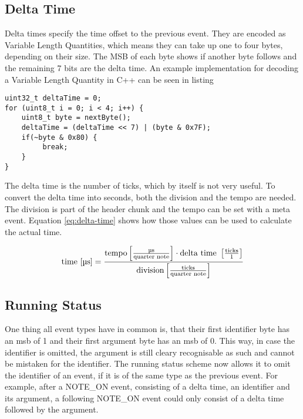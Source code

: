 \subsection{Delta Time}

Delta times specify the time offset to the previous event. They are encoded as Variable Length Quantities, which means they can take up one to four bytes, depending on their size. The MSB %
of each byte shows if another byte follows and the remaining 7 bits are the delta time. An example implementation for decoding a Variable Length Quantity in C++ can be seen in listing

\begin{lstlisting}
uint32_t deltaTime = 0;
for (uint8_t i = 0; i < 4; i++) {
    uint8_t byte = nextByte();
    deltaTime = (deltaTime << 7) | (byte & 0x7F);
    if(~byte & 0x80) {
         break;
    }
}
\end{lstlisting}

The delta time is the number of ticks, which by itself is not very useful. To convert the delta time into seconds, both the division and the tempo are needed. The division is part of the header chunk and the tempo can be set with a meta event. Equation \ref{eq:delta-time} shows how those values can be used to calculate the actual time.

\begin{equation}\label{eq:delta-time}
    \textnormal{time [\textmu s]} = \frac{{\textnormal{tempo} \left[ \frac{\textnormal{\textmu s}}{\textnormal{quarter note}} \right] \cdot \textnormal{delta time } \left[\frac{\textnormal{ticks}}{1}\right]}}{\textnormal{division}  \left[ \frac{\textnormal{ticks}}{\textnormal{quarter note}} \right]}
\end{equation}

\subsection{Running Status}

One thing all event types have in common is, that their first identifier byte has an \gls{msb} of 1 and their first argument byte has an \gls{msb} of 0. This way, in case the identifier is omitted, the argument is still cleary recognisable as such and cannot be mistaken for the identifier. The running status scheme now allows it to omit the identifier of an event, if it is of the same type as the previous event. For example, after a NOTE\_ON event, consisting of a delta time, an identifier and its argument, a following NOTE\_ON event could only consist of a delta time followed by the argument.

